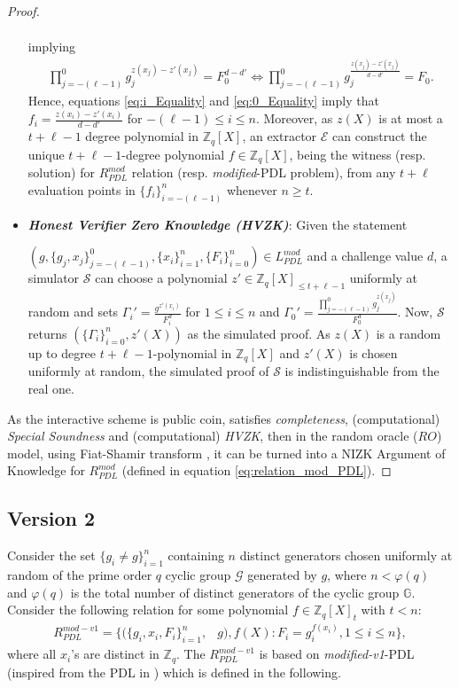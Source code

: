 \begin{proof}
\begin{itemize}
\begin{align*}
      \end{align*}
      implying
      \begin{align}\label{eq:0_Equality}
        \prod_{j=-(\ell-1)}^{0}g_j^{z(x_j)-z'(x_j)}=F_0^{d-d'} \iff \prod_{j=-(\ell-1)}^{0}g_j^{\frac{z(x_j)-z'(x_j)}{d-d'}}=F_0.
      \end{align}
      Hence, equations \ref{eq:i_Equality} and \ref{eq:0_Equality} imply that $f_i=\frac{z(x_i)-z'(x_i)}{d-d'}$ for 
      $-(\ell-1)\leq i\leq n$. Moreover, as $z(X)$ is at most a $t+\ell-1$ degree 
      polynomial in $\mathbb{Z}_q[X]$, an extractor $\mathcal{E}$ can construct the unique $t+\ell-1$-degree 
      polynomial $f\in\mathbb{Z}_q[X]$, being the witness (resp. solution) for $R_{PDL}^{mod}$ relation (resp. \textit{modified}-PDL problem), 
      from any $t+\ell$ evaluation points in $\{f_i\}_{i=-(\ell-1)}^n$ whenever $n\geq t$.
    \item \textit{\textbf{Honest Verifier Zero Knowledge (HVZK)}}: Given the statement\par $(g,\{g_j,x_j\}_{j=-(\ell-1)}^0,\{x_i\}_{i=1}^n,\{F_i\}_{i=0}^n)\in L_{PDL}^{mod}$  
      and a challenge value $d$, a simulator $\mathcal{S}$ can choose a polynomial $z'\in\mathbb{Z}_q[X]_{\leq t+\ell-1}$ uniformly 
      at random and sets $\Gamma_i'=\frac{g^{z'(x_i)}}{F_i^d}$ for $1\leq i\leq n$ and $\Gamma_0'=\frac{\prod_{j=-(\ell-1)}^{0}g_j^{z(x_j)}}{F_0^d}$. 
      Now, $\mathcal{S}$ returns $(\{\Gamma_i\}_{i=0}^n,z'(X))$ as the simulated proof. As $z(X)$ is a random 
      up to degree $t+\ell-1$-polynomial in $\mathbb{Z}_q[X]$ and $z'(X)$ is chosen uniformly at random, 
      the simulated proof of $\mathcal{S}$ is indistinguishable from the real one.
  \end{itemize}
  As the interactive scheme is public coin, satisfies \textit{completeness}, (computational) \textit{Special Soundness} 
  and (computational) \textit{HVZK}, then in the random oracle ($RO$) model, using Fiat-Shamir transform \cite{10.1007/3-540-47721-7_12}, 
  it can be turned into a NIZK Argument of Knowledge for $R_{PDL}^{mod}$ (defined in equation \ref{eq:relation_mod_PDL}).
\end{proof}


\subsection{Version 2}
\label{subsec:v1}
Consider the set $\{g_i\neq g\}_{i=1}^n$ containing $n$ distinct generators chosen uniformly at random of 
the prime order $q$ cyclic group $\mathcal{G}$ generated by $g$, where $n<\varphi(q)$ and $\varphi(q)$ is 
the total number of distinct generators of the cyclic group $\mathbb{G}$. Consider the following relation for 
some polynomial $f\in\mathbb{Z}_q[X]_{t}$ with $t<n$:
\begin{align}\label{eq:relation_mod_v1_PDL}
  R_{PDL}^{mod-v1} = \{(\{g_i,x_i,F_i\}_{i=1}^n,&g),f(X) : F_i=g_i^{f(x_i)}, 1\leq i\leq n\},
\end{align}
where all $x_i$'s are distinct in $\mathbb{Z}_q$. The $R_{PDL}^{mod-v1}$ is based on \textit{modified-v1}-PDL 
(inspired from the PDL in \cite{cryptoeprint:2023/1669}) which is defined in the following.

